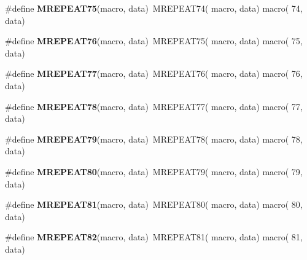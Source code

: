 \begin{DoxyCompactItemize}
\item 
\hypertarget{group__group__xmega__utils__mrepeat_ga0b35f78c7db7ec7d73d5af309eb1c59c}{\#define {\bfseries M\-R\-E\-P\-E\-A\-T75}(macro, data)~M\-R\-E\-P\-E\-A\-T74( macro, data)   macro( 74, data)}\label{group__group__xmega__utils__mrepeat_ga0b35f78c7db7ec7d73d5af309eb1c59c}

\item 
\hypertarget{group__group__xmega__utils__mrepeat_ga58c5f129a638f3cad65063a67dbdcbb6}{\#define {\bfseries M\-R\-E\-P\-E\-A\-T76}(macro, data)~M\-R\-E\-P\-E\-A\-T75( macro, data)   macro( 75, data)}\label{group__group__xmega__utils__mrepeat_ga58c5f129a638f3cad65063a67dbdcbb6}

\item 
\hypertarget{group__group__xmega__utils__mrepeat_ga1831e4c1682945001b9b5fc06dedc788}{\#define {\bfseries M\-R\-E\-P\-E\-A\-T77}(macro, data)~M\-R\-E\-P\-E\-A\-T76( macro, data)   macro( 76, data)}\label{group__group__xmega__utils__mrepeat_ga1831e4c1682945001b9b5fc06dedc788}

\item 
\hypertarget{group__group__xmega__utils__mrepeat_ga970169b9fc014f633cefa289e7acc5f7}{\#define {\bfseries M\-R\-E\-P\-E\-A\-T78}(macro, data)~M\-R\-E\-P\-E\-A\-T77( macro, data)   macro( 77, data)}\label{group__group__xmega__utils__mrepeat_ga970169b9fc014f633cefa289e7acc5f7}

\item 
\hypertarget{group__group__xmega__utils__mrepeat_ga8ca389624ac706853a8b95daa9b60074}{\#define {\bfseries M\-R\-E\-P\-E\-A\-T79}(macro, data)~M\-R\-E\-P\-E\-A\-T78( macro, data)   macro( 78, data)}\label{group__group__xmega__utils__mrepeat_ga8ca389624ac706853a8b95daa9b60074}

\item 
\hypertarget{group__group__xmega__utils__mrepeat_ga4e1ab69f4a649fc9f759f19ddf0150bd}{\#define {\bfseries M\-R\-E\-P\-E\-A\-T80}(macro, data)~M\-R\-E\-P\-E\-A\-T79( macro, data)   macro( 79, data)}\label{group__group__xmega__utils__mrepeat_ga4e1ab69f4a649fc9f759f19ddf0150bd}

\item 
\hypertarget{group__group__xmega__utils__mrepeat_ga20dda5110c7ee8595742b7493a50fa84}{\#define {\bfseries M\-R\-E\-P\-E\-A\-T81}(macro, data)~M\-R\-E\-P\-E\-A\-T80( macro, data)   macro( 80, data)}\label{group__group__xmega__utils__mrepeat_ga20dda5110c7ee8595742b7493a50fa84}

\item 
\hypertarget{group__group__xmega__utils__mrepeat_gab614d1a44b41de1264618e26d1f457c6}{\#define {\bfseries M\-R\-E\-P\-E\-A\-T82}(macro, data)~M\-R\-E\-P\-E\-A\-T81( macro, data)   macro( 81, data)}\label{group__group__xmega__utils__mrepeat_gab614d1a44b41de1264618e26d1f457c6}


\end{DoxyCompactItemize}
